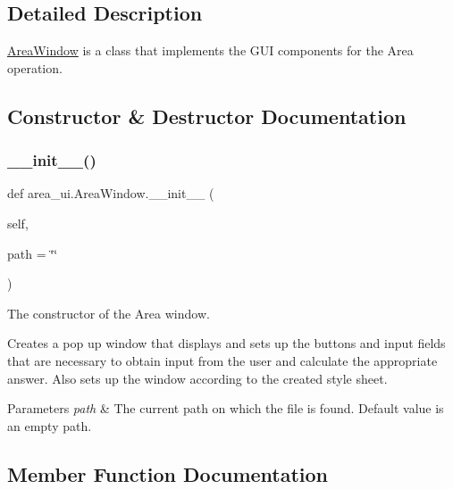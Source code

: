 \subsection{Detailed Description}
\hyperlink{classarea__ui_1_1_area_window}{Area\+Window} is a class that implements the G\+UI components for the Area operation. 

\subsection{Constructor \& Destructor Documentation}
\mbox{\label{classarea__ui_1_1_area_window_a4147cce2b2137dde0a7ac73901b8d9a4}} 
\subsubsection{\texorpdfstring{\+\_\+\+\_\+init\+\_\+\+\_\+()}{\_\_init\_\_()}}
{\footnotesize\ttfamily def area\+\_\+ui.\+Area\+Window.\+\_\+\+\_\+init\+\_\+\+\_\+ (\begin{DoxyParamCaption}\item[{}]{self,  }\item[{}]{path = {\ttfamily \char`\"{}\char`\"{}} }\end{DoxyParamCaption})}



The constructor of the Area window. 

Creates a pop up window that displays and sets up the buttons and input fields that are necessary to obtain input from the user and calculate the appropriate answer. Also sets up the window according to the created style sheet. 
\begin{DoxyParams}{Parameters}
{\em path} & The current path on which the file is found. Default value is an empty path. \\
\hline
\end{DoxyParams}


\subsection{Member Function Documentation}
\mbox{\label{classarea__ui_1_1_area_window_af95844b38370da348b28e9b1238467ad}} 
